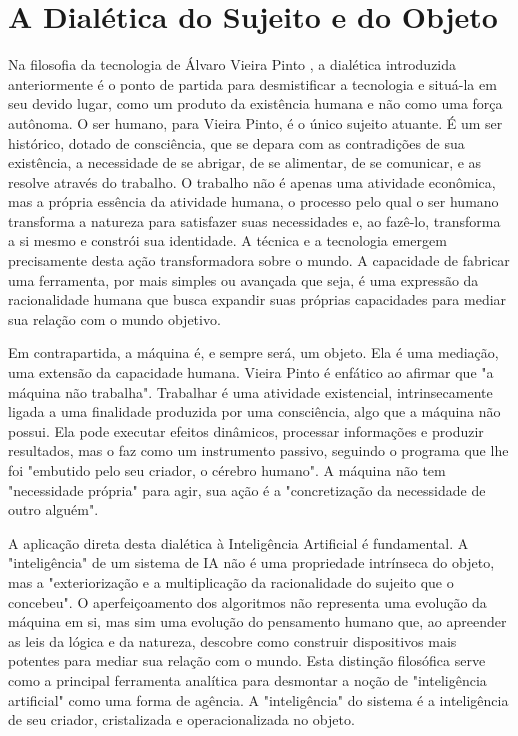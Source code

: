 \section{A Dialética do Sujeito e do Objeto}\label{sec:dialetica}

Na filosofia da tecnologia de Álvaro Vieira Pinto \cite{VieiraPinto2005}, a dialética introduzida anteriormente é o ponto de partida para desmistificar a tecnologia e situá-la em seu devido lugar, como 
um produto da existência humana e não como uma força autônoma. 
O ser humano, para Vieira Pinto, é o único sujeito atuante. 
É um ser histórico, dotado de consciência, que se depara com as contradições de sua existência, a necessidade de se 
abrigar, de se alimentar, de se comunicar, e as resolve através do trabalho. 
O trabalho não é apenas uma atividade econômica, mas a própria essência da atividade humana, o 
processo pelo qual o ser humano transforma a natureza para satisfazer suas necessidades e, ao fazê-lo, transforma a si mesmo e constrói sua identidade. 
A técnica e a tecnologia 
emergem precisamente desta ação transformadora sobre o mundo. 
A capacidade de fabricar uma ferramenta, por mais simples ou avançada que seja, é uma expressão da racionalidade 
humana que busca expandir suas próprias capacidades para mediar sua relação com o mundo objetivo. 

Em contrapartida, a máquina é, e sempre será, um objeto. Ela é uma mediação, uma extensão da capacidade humana. 
Vieira Pinto é enfático ao afirmar que "a máquina não trabalha". 
Trabalhar é uma atividade existencial, intrinsecamente ligada a uma finalidade produzida por uma consciência, algo que a máquina não possui. 
Ela pode executar efeitos dinâmicos, 
processar informações e produzir resultados, mas o faz como um instrumento passivo, seguindo o programa que lhe foi "embutido pelo seu criador, o cérebro humano". 
A máquina não tem "necessidade própria" para agir, sua ação é a "concretização da necessidade de outro alguém". 

A aplicação direta desta dialética à Inteligência Artificial é fundamental. 
A "inteligência" de um sistema de IA não é uma propriedade intrínseca do objeto, mas a 
"exteriorização e a multiplicação da racionalidade do sujeito que o concebeu". 
O aperfeiçoamento dos algoritmos não representa uma evolução da máquina em si, mas sim uma 
evolução do pensamento humano que, ao apreender as leis da lógica e da natureza, descobre como construir dispositivos mais potentes para mediar sua relação com o mundo. 
Esta distinção filosófica serve como a principal ferramenta analítica para desmontar a noção de "inteligência artificial" como uma forma de agência. 
A "inteligência" do sistema 
é a inteligência de seu criador, cristalizada e operacionalizada no objeto. 


